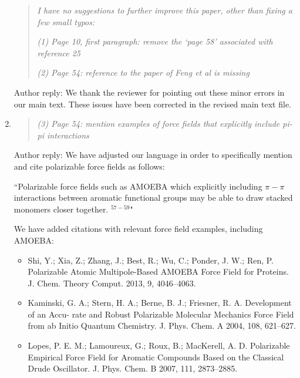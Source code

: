 \documentclass{article}
\begin{document}
\begin{enumerate}
\begin{quote}
	\textit{I have no suggestions to further improve this paper, other than fixing a few small typos:}
	
    \textit{(1) Page 10, first paragraph: remove the ‘page 58’ associated with reference 25}

    \textit{(2) Page 54: reference to the paper of Feng et al is missing}

	\end{quote}
    
    Author reply: We thank the reviewer for pointing out these minor errors in our main text. These issues have been corrected in
    the revised main text file. %
    
    \item \begin{quote} \textit{(3) Page 54: mention examples of force fields that explicitly include pi-pi interactions
    } \end{quote}
    
    Author reply: We have adjusted our language in order to specifically mention and cite polarizable force fields as follows: 
    
    ``Polarizable force fields such as AMOEBA which explicitly including $\pi-\pi$ interactions
    between aromatic functional groups may be able to draw stacked monomers closer together. 
    $^{57-59}$"
     
    We have added citations with relevant force field examples, including AMOEBA:
     
    \begin{itemize}
     
    \item Shi, Y.; Xia, Z.; Zhang, J.; Best, R.; Wu, C.; Ponder, J. W.; Ren, P. Polarizable Atomic
    Multipole-Based AMOEBA Force Field for Proteins. J. Chem. Theory Comput. 2013,
    9, 4046–4063.
    
    \item Kaminski, G. A.; Stern, H. A.; Berne, B. J.; Friesner, R. A. Development of an Accu-
    rate and Robust Polarizable Molecular Mechanics Force Field from ab Initio Quantum
    Chemistry. J. Phys. Chem. A 2004, 108, 621–627.
    
    \item Lopes, P. E. M.; Lamoureux, G.; Roux, B.; MacKerell, A. D. Polarizable Empirical
    Force Field for Aromatic Compounds Based on the Classical Drude Oscillator. J. Phys.
    Chem. B 2007, 111, 2873–2885.
    
    \end{itemize}

\end{enumerate}
\end{document}
